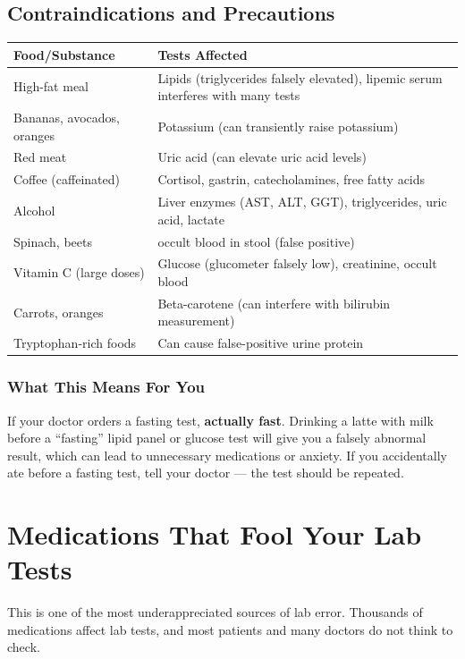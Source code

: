 \subsection{Contraindications and Precautions}

\begin{longtable}{@{}p{4.5cm}p{10.5cm}@{}}
\toprule
\textbf{Food/Substance} & \textbf{Tests Affected} \\
\midrule
High-fat meal & Lipids (triglycerides falsely elevated), lipemic serum interferes with many tests \\
Bananas, avocados, oranges & Potassium (can transiently raise potassium) \\
Red meat & Uric acid (can elevate uric acid levels) \\
Coffee (caffeinated) & Cortisol, gastrin, catecholamines, free fatty acids \\
Alcohol & Liver enzymes (AST, ALT, GGT), triglycerides, uric acid, lactate \\
Spinach, beets & occult blood in stool (false positive) \\
Vitamin C (large doses) & Glucose (glucometer falsely low), creatinine, occult blood \\
Carrots, oranges & Beta-carotene (can interfere with bilirubin measurement) \\
Tryptophan-rich foods & Can cause false-positive urine protein \\
\bottomrule
\end{longtable}

\subsubsection{What This Means For You}

If your doctor orders a fasting test, \textbf{actually fast}. Drinking a latte with milk before a ``fasting'' lipid panel or glucose test will give you a falsely abnormal result, which can lead to unnecessary medications or anxiety. If you accidentally ate before a fasting test, tell your doctor --- the test should be repeated.

\clearpage
\section{Medications That Fool Your Lab Tests}

This is one of the most underappreciated sources of lab error. Thousands of medications affect lab tests, and most patients and many doctors do not think to check.

